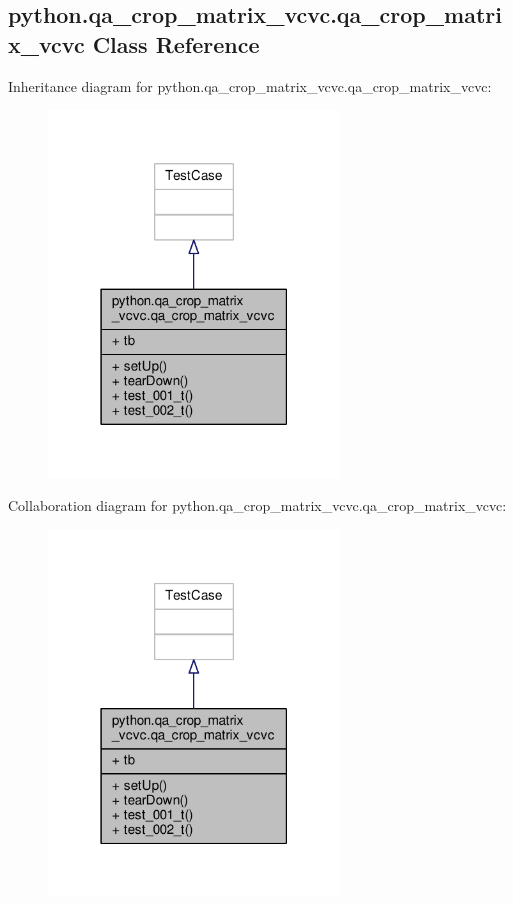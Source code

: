 \subsection{python.\+qa\+\_\+crop\+\_\+matrix\+\_\+vcvc.\+qa\+\_\+crop\+\_\+matrix\+\_\+vcvc Class Reference}
\label{classpython_1_1qa__crop__matrix__vcvc_1_1qa__crop__matrix__vcvc}


Inheritance diagram for python.\+qa\+\_\+crop\+\_\+matrix\+\_\+vcvc.\+qa\+\_\+crop\+\_\+matrix\+\_\+vcvc\+:
\nopagebreak
\begin{figure}[H]
\begin{center}
\leavevmode
\includegraphics[width=219pt]{d2/d01/classpython_1_1qa__crop__matrix__vcvc_1_1qa__crop__matrix__vcvc__inherit__graph}
\end{center}
\end{figure}


Collaboration diagram for python.\+qa\+\_\+crop\+\_\+matrix\+\_\+vcvc.\+qa\+\_\+crop\+\_\+matrix\+\_\+vcvc\+:
\nopagebreak
\begin{figure}[H]
\begin{center}
\leavevmode
\includegraphics[width=219pt]{d3/dd8/classpython_1_1qa__crop__matrix__vcvc_1_1qa__crop__matrix__vcvc__coll__graph}
\end{center}
\end{figure}
